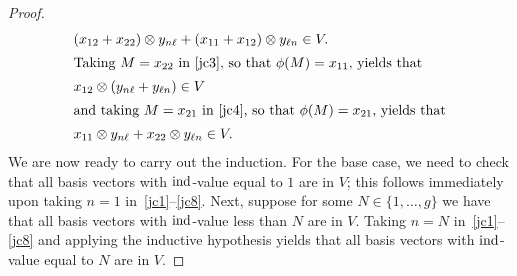 \begin{proof}
\begin{align}
	& (x_{12} + x_{22}) \otimes y_{n\ell} + (x_{11} + x_{12}) \otimes y_{\ell n} \in V. \label{jc7} \\
\intertext{Taking $M = x_{22}$ in~\eqref{jc3}, so that $\phi(M) = x_{11}$, yields that}
& x_{12} \otimes (y_{n \ell} + y_{\ell n}) \in V \label{jc4} \\
\intertext{and taking $M = x_{21}$ in~\eqref{jc4}, so that $\phi(M) = x_{21}$, yields that}
&  x_{11} \otimes y_{n \ell} + x_{22} \otimes y_{\ell n} \in V. \label{jc8}
\end{align}
We are now ready to carry out the induction. For the base case, we need to check that all basis vectors with $\operatorname{ind}$-value equal to $1$ are in $V$; this follows immediately upon taking $n = 1$ in~\eqref{jc1}--\eqref{jc8}. Next, suppose for some $N \in \{1, \dots, g\}$ we have that all basis vectors with $\operatorname{ind}$-value less than $N$ are in $V$. Taking $n = N$ in~\eqref{jc1}--\eqref{jc8} and applying the inductive hypothesis yields that all basis vectors with $\operatorname{ind}$-value equal to $N$ are in $V$.
\end{proof}
